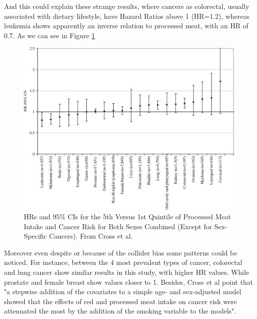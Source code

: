 \documentclass{article}
\begin{document}
And this could explain these strange results, where cancers as colorectal, usually associated with dietary lifestyle, have Hazard Ratios above 1 (HR=1.2), whereas leukemia shows apparently an inverse relation to processed meat, with an HR of 0.7. As we can see in Figure \ref{fig:cross}
\begin{figure}
  \includegraphics[scale=0.75]{tileshop2}
  \caption{HRs and 95\% CIs for the 5th Versus 1st Quintile of Processed Meat Intake and Cancer Risk for Both Sexes Combined (Except for Sex-Specific Cancers). From Cross et al. \cite{cross}}
  \label{fig:cross}
\end{figure}



Moreover even despite or because of the collider bias some patterns could be noticed. For instance, between the 4 most prevalent types of cancer, colorectal and lung cancer show similar results in this study, with higher HR values. While prostate and female breast show values closer to 1. Besides, Cross et al point that "a stepwise addition of the covariates to a simple age- and sex-adjusted model showed that the effects of red and processed meat intake on cancer risk were attenuated the most by the addition of the smoking variable to the models". %
\end{document}
